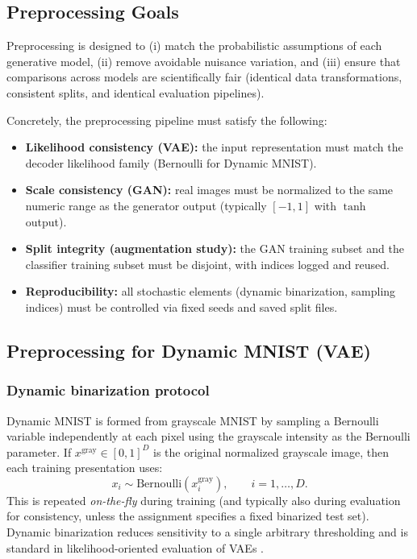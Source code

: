 
\subsection{Preprocessing Goals}
Preprocessing is designed to (i) match the probabilistic assumptions of each generative model, (ii) remove avoidable nuisance variation, and (iii) ensure that comparisons across models are scientifically fair (identical data transformations, consistent splits, and identical evaluation pipelines).

Concretely, the preprocessing pipeline must satisfy the following:
\begin{itemize}
  \item \textbf{Likelihood consistency (VAE):} the input representation must match the decoder likelihood family (Bernoulli for Dynamic MNIST).
  \item \textbf{Scale consistency (GAN):} real images must be normalized to the same numeric range as the generator output (typically $[-1,1]$ with $\tanh$ output).
  \item \textbf{Split integrity (augmentation study):} the GAN training subset and the classifier training subset must be disjoint, with indices logged and reused.
  \item \textbf{Reproducibility:} all stochastic elements (dynamic binarization, sampling indices) must be controlled via fixed seeds and saved split files.
\end{itemize}

\subsection{Preprocessing for Dynamic MNIST (VAE)}
\subsubsection{Dynamic binarization protocol}
Dynamic MNIST is formed from grayscale MNIST by sampling a Bernoulli variable independently at each pixel using the grayscale intensity as the Bernoulli parameter. If $x^{\mathrm{gray}}\in[0,1]^D$ is the original normalized grayscale image, then each training presentation uses:
\[
x_i \sim \mathrm{Bernoulli}\left(x^{\mathrm{gray}}_i\right),
\qquad i=1,\dots,D.
\]
This is repeated \emph{on-the-fly} during training (and typically also during evaluation for consistency, unless the assignment specifies a fixed binarized test set). Dynamic binarization reduces sensitivity to a single arbitrary thresholding and is standard in likelihood-oriented evaluation of VAEs \citep{kingma2014vae,rezende2014stochastic}.

